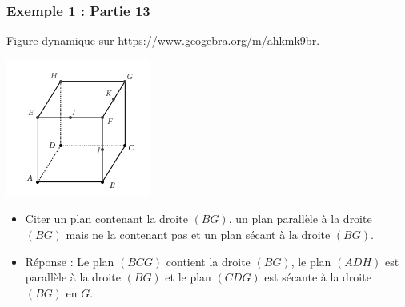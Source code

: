 \documentclass[xcolor=svgnames,t,final]{beamer}
\begin{document}
\begin{frame}

\frametitle{Exemple 1 : Partie 13}

Figure dynamique sur \href{https://www.geogebra.org/m/ahkmk9br}{https://www.geogebra.org/m/ahkmk9br}.


\begin{center}
\includegraphics[scale=0.4]{images/exemple1.png}
\end{center}

\begin{itemize}
\pause \item {\color{blue}   Citer un plan contenant la droite $(BG)$, un plan parallèle à la droite $(BG)$ mais ne la contenant pas et un plan sécant à la droite $(BG)$.}
\pause \item {\color{red} Réponse :  Le plan $(BCG)$ contient la droite $(BG)$, le plan $(ADH)$ est parallèle à la droite $(BG)$ et le plan $(CDG)$ est sécante à la droite $(BG)$ en $G$. 
}
\end{itemize}


\end{frame}
\end{document}

